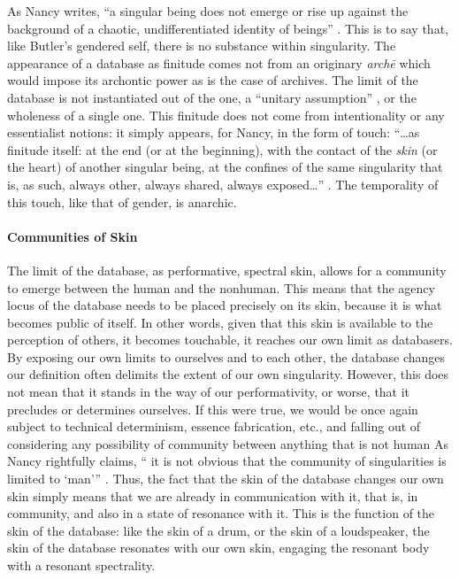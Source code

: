 As Nancy writes, ``a singular being does not emerge or rise up against the background of a chaotic, undifferentiated identity of beings'' \cite[28]{Nan91:The}. This is to say that, like Butler's gendered self, there is no substance within singularity. 
The appearance of a database as finitude comes not from an originary \textit{archē} which would impose its archontic power as is the case of archives. 
The limit of the database is not instantiated out of the one, a ``unitary assumption'' \cite[28]{Nan91:The}, or the wholeness of a single one. This finitude does not come from intentionality or any essentialist notions: it simply appears, for Nancy, in the form of touch: ``\dots as finitude itself: at the end (or at the beginning), with the contact of the \textit{skin} (or the heart) of another singular being, at the confines of the same singularity that is, as such, always other, always shared, always exposed\dots'' \im \cite[28]{Nan91:The}. The temporality of this touch, like that of gender, is anarchic.

\paragraph{Communities of Skin}

The limit of the database, as performative, spectral skin, allows for a community to emerge between the human and the nonhuman. This means that the agency locus of the database needs to be placed precisely on its skin, because it is what becomes public of itself. In other words, given that this skin is available to the perception of others, it becomes touchable, it reaches our own limit as databasers. By exposing our own limits to ourselves and to each other, the database changes our definition often delimits the extent of our own singularity. 
However, this does not mean that it stands in the way of our performativity, or worse, that it precludes or determines ourselves. If this were true, we would be once again subject to technical determinism, essence fabrication, etc., and falling out of considering any possibility of community between anything that is not human 
 As Nancy rightfully claims, `` it is not obvious that the community of singularities is limited to `man''' \cite[28]{Nan91:The}. Thus, the fact that the skin of the database changes our own skin simply means that we are already in communication with it, that is, in community, and also in a state of resonance with it. This is the function of the skin of the database: like the skin of a drum, or the skin of a loudspeaker, the skin of the database resonates with our own skin, engaging the resonant body with a resonant spectrality. 

